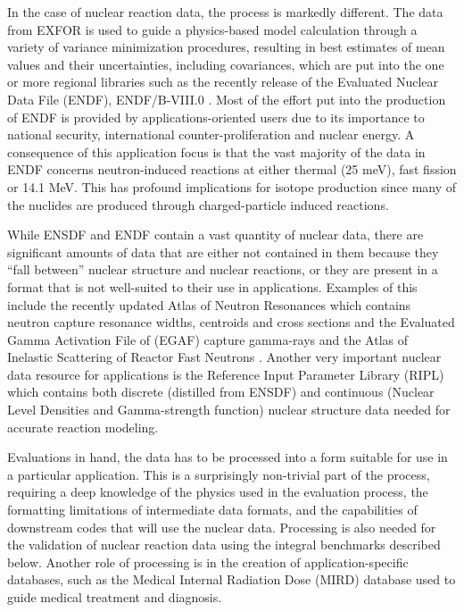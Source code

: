 \documentclass[letterpaper]{ar-1col}
\begin{document}
In the case of nuclear reaction data, the process is markedly different.
 The data from EXFOR is used to guide a physics-based model calculation through a variety of variance minimization procedures, resulting in best estimates of mean values and their uncertainties, including covariances, which are put into the one or more regional libraries such as the recently release of the Evaluated Nuclear Data File (ENDF), ENDF/B-VIII.0 \cite{endf8_0}.
 Most of the effort put into the production of ENDF is provided by applications-oriented users due to its importance to national security, international counter-proliferation and nuclear energy.
 A consequence of this application focus is that the vast majority of the data in ENDF concerns neutron-induced reactions at either thermal (25 meV), fast fission or 14.1 MeV.
 This has profound implications for isotope production since many of the nuclides are produced through charged-particle induced reactions.
 

While ENSDF and ENDF contain a vast quantity of nuclear data, there are significant amounts of data that are either not contained in them because they \enquote{fall between} nuclear structure and nuclear reactions, or they are present in a format that is not well-suited to their use in applications.
 Examples of this include the recently updated Atlas of Neutron Resonances \cite{Mug18} which contains neutron capture resonance widths, centroids and cross sections and the Evaluated Gamma Activation File of (EGAF) capture gamma-rays \cite{Fir15} and the Atlas of Inelastic Scattering of Reactor Fast Neutrons \cite{Hur18}.
 Another very important nuclear data resource for applications is the Reference Input Parameter Library (RIPL) \cite{Capote2009} which contains both discrete (distilled from ENSDF) and continuous (Nuclear Level Densities and Gamma-strength function) nuclear structure data needed for accurate reaction modeling.
 

Evaluations in hand, the data has to be processed into a form suitable for use in a particular application.
 This is a surprisingly non-trivial part of the process, requiring a deep knowledge of the physics used in the evaluation process, the formatting limitations of intermediate data formats, and the capabilities of downstream codes that will use the nuclear data.
 Processing is also needed for the validation of nuclear reaction data using the integral benchmarks described below.
 Another role of processing is in the creation of application-specific databases, such as the Medical Internal Radiation Dose (MIRD) \cite{MIRD} database used to guide medical treatment and diagnosis.
 
\end{document}
